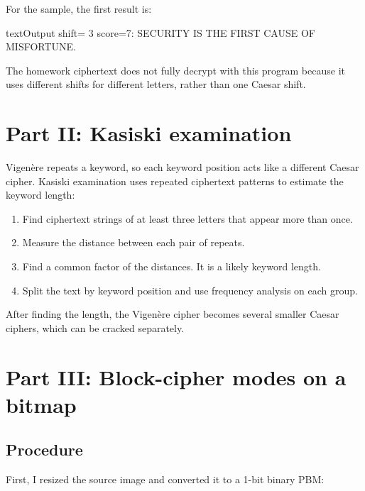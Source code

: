             For the sample, the first result is:

            \begin{codeblock}[]{text}{Output}
                shift= 3 score=7: SECURITY IS THE FIRST CAUSE OF MISFORTUNE.
            \end{codeblock}

            The homework ciphertext does not fully decrypt with this program because it uses
            different shifts for different letters, rather than one Caesar shift.

    \pagebreak

    \section{Part II: Kasiski examination}

        Vigen\`ere repeats a keyword, so each keyword position acts like a different Caesar
        cipher. Kasiski examination uses repeated ciphertext patterns to estimate the keyword
        length:

        \begin{enumerate}
            \item Find ciphertext strings of at least three letters that appear more than once.
            \item Measure the distance between each pair of repeats.
            \item Find a common factor of the distances. It is a likely keyword length.
            \item Split the text by keyword position and use frequency analysis on each group.
        \end{enumerate}

        After finding the length, the Vigen\`ere cipher becomes several smaller Caesar ciphers,
        which can be cracked separately.

    \pagebreak

    \section{Part III: Block-cipher modes on a bitmap}

        \subsection{Procedure}

            First, I resized the source image and converted it to a 1-bit binary PBM:


